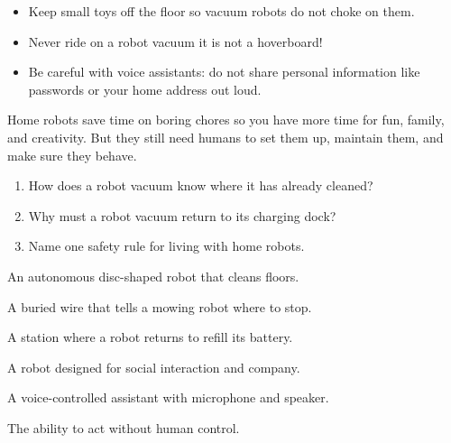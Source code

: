 \begin{itemize}
  \item Keep small toys off the floor so vacuum robots do not choke on them.
  \item Never ride on a robot vacuum \textemdash{} it is not a hoverboard!
  \item Be careful with voice assistants: do not share personal information
    like passwords or your home address out loud.
\end{itemize}

\begin{bigidea}
  Home robots save time on boring chores so you have more time
  for fun, family, and creativity. But they still need humans
  to set them up, maintain them, and make sure they behave.
\end{bigidea}

\sectionrule


\begin{quickcheck}
  \begin{enumerate}
    \item How does a robot vacuum know where it has already cleaned?
    \item Why must a robot vacuum return to its charging dock?
    \item Name one safety rule for living with home robots.
  \end{enumerate}
\end{quickcheck}

\sectionrule
\begin{newwords}
  \begin{description}[labelwidth=3.8cm, leftmargin=4.0cm]
    \item[Robot vacuum] An autonomous disc-shaped robot that cleans floors.
    \item[Boundary wire] A buried wire that tells a mowing robot where to stop.
    \item[Charging dock] A station where a robot returns to refill its battery.
    \item[Companion robot] A robot designed for social interaction and company.
    \item[Smart speaker] A voice-controlled assistant with microphone and speaker.
    \item[Autonomy] The ability to act without human control.
  \end{description}
\end{newwords}
